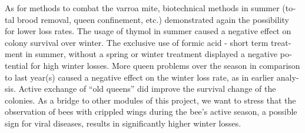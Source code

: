 \begin{otherlanguage}{english}
As for methods to combat the varroa mite, biotechnical methods in summer (total brood removal, queen confinement, etc.) demonstrated again the possibility for lower loss rates. The usage of thymol in summer caused a negative effect on colony survival over winter. The exclusive use of formic acid - short term treatment in summer, without a spring or winter treatment displayed a negative potential for high winter losses.
\newline
More queen problems over the season in comparison to last year(s) caused a negative effect on the winter loss rate, as in earlier analysis. Active exchange of \enquote{old queens} did improve the survival change of the colonies.
\newline
As a bridge to other modules of this project, we want to stress that the observation of bees with crippled wings during the bee’s active season, a possible sign for viral diseases, results in significantly higher winter losses. 
\end{otherlanguage}
